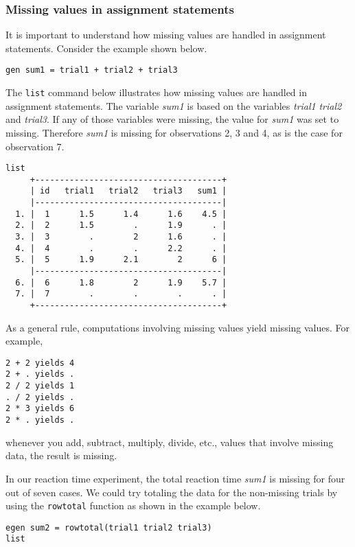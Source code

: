 \subsubsection{Missing values in assignment statements}

It is important to understand how missing values are handled in assignment statements. Consider the example shown below.

\begin{lstlisting}
gen sum1 = trial1 + trial2 + trial3
\end{lstlisting}

The \lstinline{list} command below illustrates how missing values are handled in assignment statements. The variable \textit{sum1} is based on the variables \textit{trial1} \textit{trial2} and \textit{trial3}. If any of those variables were missing, the value for \textit{sum1} was set to missing. Therefore \textit{sum1} is missing for observations 2, 3 and 4, as is the case for observation 7.

\begin{lstlisting}
list
     +--------------------------------------+
     | id   trial1   trial2   trial3   sum1 |
     |--------------------------------------|
  1. |  1      1.5      1.4      1.6    4.5 |
  2. |  2      1.5        .      1.9      . |
  3. |  3        .        2      1.6      . |
  4. |  4        .        .      2.2      . |
  5. |  5      1.9      2.1        2      6 |
     |--------------------------------------|
  6. |  6      1.8        2      1.9    5.7 |
  7. |  7        .        .        .      . |
     +--------------------------------------+
\end{lstlisting}

As a general rule, computations involving missing values yield missing values. For example,

\begin{lstlisting}
2 + 2 yields 4
2 + . yields .
2 / 2 yields 1
. / 2 yields .
2 * 3 yields 6
2 * . yields .
\end{lstlisting}

whenever you add, subtract, multiply, divide, etc., values that involve missing data, the result is missing.

In our reaction time experiment, the total reaction time \textit{sum1} is missing for four out of seven cases. We could try totaling the data for the non-missing trials by using the \lstinline{rowtotal} function as shown in the example below.

\begin{lstlisting}
egen sum2 = rowtotal(trial1 trial2 trial3)
list
\end{lstlisting}

